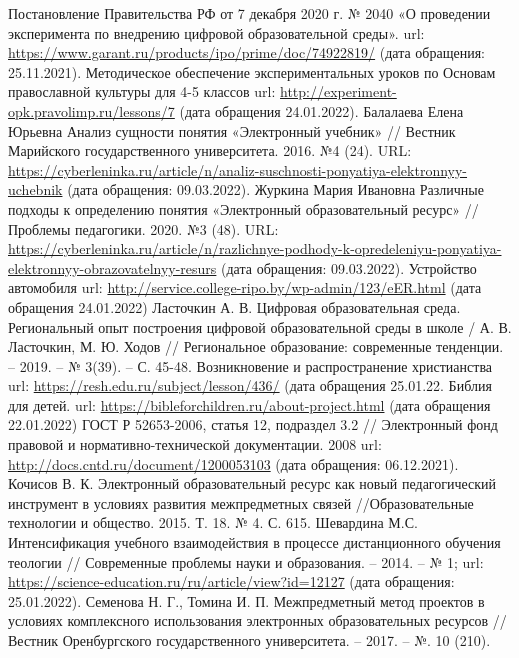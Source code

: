 \newpage
\large
\begin{thebibliography}{99}
  Постановление Правительства РФ от 7 декабря 2020 г. № 2040 «О проведении эксперимента по внедрению цифровой образовательной среды». url: \url{https://www.garant.ru/products/ipo/prime/doc/74922819/} (дата обращения: 25.11.2021).
  Методическое обеспечение экспериментальных уроков по Основам православной культуры для 4-5 классов url: \url{http://experiment-opk.pravolimp.ru/lessons/7} (дата обращения 24.01.2022).
 Балалаева Елена Юрьевна Анализ сущности понятия «Электронный учебник» // Вестник Марийского государственного университета. 2016. №4 (24). URL: \url{https://cyberleninka.ru/article/n/analiz-suschnosti-ponyatiya-elektronnyy-uchebnik} (дата обращения: 09.03.2022).
 Журкина Мария Ивановна Различные подходы к определению понятия «Электронный образовательный ресурс» // Проблемы педагогики. 2020. №3 (48). URL: \url {https://cyberleninka.ru/article/n/razlichnye-podhody-k-opredeleniyu-ponyatiya-elektronnyy-obrazovatelnyy-resurs} (дата обращения: 09.03.2022).
  Устройство автомобиля url: \url{http://service.college-ripo.by/wp-admin/123/eER.html} (дата обращения 24.01.2022)
  Ласточкин А. В. Цифровая образовательная среда. Региональный опыт построения цифровой образовательной среды в школе / А. В. Ласточкин, М. Ю. Ходов // Региональное образование: современные тенденции. – 2019. – № 3(39). – С. 45-48.
  Возникновение и распространение христианства url: \url{https://resh.edu.ru/subject/lesson/436/} (дата обращения 25.01.22.
  Библия для детей. url: \url{https://bibleforchildren.ru/about-project.html} (дата обращения 22.01.2022)
  ГОСТ Р 52653-2006, статья 12, подраздел 3.2 // Электронный фонд правовой и нормативно-технической документации. 2008 url: \url{http://docs.cntd.ru/document/1200053103} (дата обращения: 06.12.2021).
  Кочисов В. К. Электронный образовательный ресурс как новый педагогический инструмент в условиях развития межпредметных связей //Образовательные технологии и общество. 2015. Т. 18. № 4. С. 615.
  Шевардина М.С. Интенсификация учебного взаимодействия в процессе дистанционного обучения теологии // Современные проблемы науки и образования. – 2014. – № 1; url: \url{https://science-education.ru/ru/article/view?id=12127} (дата обращения: 25.01.2022).
  Семенова Н. Г., Томина И. П. Межпредметный метод проектов в условиях комплексного использования электронных образовательных ресурсов //Вестник Оренбургского государственного университета. – 2017. – №. 10 (210).

\end{thebibliography}
